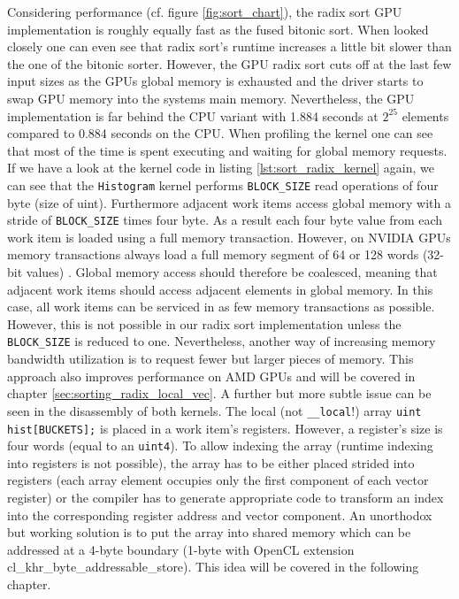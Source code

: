 Considering performance (cf. figure \ref{fig:sort_chart}), the radix sort GPU implementation is roughly equally fast as the fused bitonic sort. When looked closely one can even see that radix sort's runtime increases a little bit slower than the one of the bitonic sorter. However, the GPU radix sort cuts off at the last few input sizes as the GPUs global memory is exhausted and the driver starts to swap GPU memory into the systems main memory. Nevertheless, the GPU implementation is far behind the CPU variant with 1.884 seconds at $2^{25}$ elements compared to 0.884 seconds on the CPU.
When profiling the kernel one can see that most of the time is spent executing and waiting for global memory requests. If we have a look at the kernel code in listing \ref{lst:sort_radix_kernel} again, we can see that the \lstinline!Histogram! kernel performs \lstinline!BLOCK_SIZE! read operations of four byte (size of uint). Furthermore adjacent work items access global memory with a stride of \lstinline!BLOCK_SIZE! times four byte. As a result each four byte value from each work item is loaded using a full memory transaction. However, on NVIDIA GPUs memory transactions always load a full memory segment of 64 or 128 words (32-bit values) \cite[p13]{nvidia_opencl_best_practices}. Global memory access should therefore be coalesced, meaning that adjacent work items should access adjacent elements in global memory. In this case, all work items can be serviced in as few memory transactions as possible. However, this is not possible in our radix sort implementation unless the \lstinline!BLOCK_SIZE! is reduced to one. Nevertheless, another way of increasing memory bandwidth utilization is to request fewer but larger pieces of memory. This approach also improves performance on AMD GPUs and will be covered in chapter \ref{sec:sorting_radix_local_vec}.
A further but more subtle issue can be seen in the disassembly of both kernels. The local (not \lstinline!__local!!) array \lstinline!uint hist[BUCKETS];! is placed in a work item's registers. However, a register's size is four words (equal to an \lstinline!uint4!). To allow indexing the array (runtime indexing into registers is not possible), the array has to be either placed strided into registers (each array element occupies only the first component of each vector register) or the compiler has to generate appropriate code to transform an index into the corresponding register address and vector component. An unorthodox but working solution is to put the array into shared memory which can be addressed at a 4-byte boundary (1-byte with OpenCL extension cl\_khr\_byte\_addressable\_store). This idea will be covered in the following chapter.

